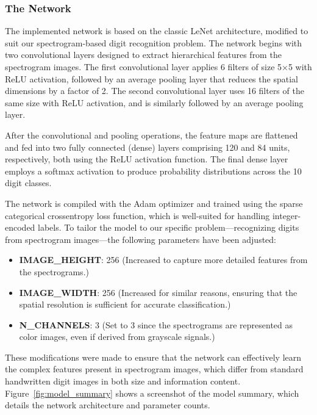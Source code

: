 \documentclass[a4paper,12pt]{article}
\begin{document}
\subsubsection{The Network}
The implemented network is based on the classic LeNet architecture, modified to suit our spectrogram-based digit recognition problem. The network begins with two convolutional layers designed to extract hierarchical features from the spectrogram images. The first convolutional layer applies 6 filters of size 5×5 with ReLU activation, followed by an average pooling layer that reduces the spatial dimensions by a factor of 2. The second convolutional layer uses 16 filters of the same size with ReLU activation, and is similarly followed by an average pooling layer.

After the convolutional and pooling operations, the feature maps are flattened and fed into two fully connected (dense) layers comprising 120 and 84 units, respectively, both using the ReLU activation function. The final dense layer employs a softmax activation to produce probability distributions across the 10 digit classes.

The network is compiled with the Adam optimizer and trained using the sparse categorical crossentropy loss function, which is well-suited for handling integer-encoded labels. To tailor the model to our specific problem—recognizing digits from spectrogram images—the following parameters have been adjusted:
\begin{itemize}
    \item \textbf{IMAGE\_HEIGHT}: 256 \quad (Increased to capture more detailed features from the spectrograms.)
    \item \textbf{IMAGE\_WIDTH}: 256 \quad (Increased for similar reasons, ensuring that the spatial resolution is sufficient for accurate classification.)
    \item \textbf{N\_CHANNELS}: 3 \quad (Set to 3 since the spectrograms are represented as color images, even if derived from grayscale signals.)
\end{itemize}

These modifications were made to ensure that the network can effectively learn the complex features present in spectrogram images, which differ from standard handwritten digit images in both size and information content. Figure~\ref{fig:model_summary} shows a screenshot of the model summary, which details the network architecture and parameter counts.
\end{document}
